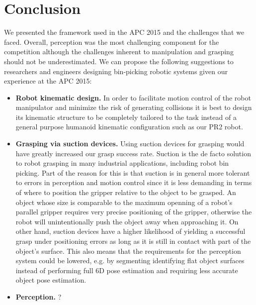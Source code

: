 \documentclass[letterpaper, 10pt, conference]{ieeeconf}
\begin{document}












\section{Conclusion}
\label{sec:conclusion}

We presented the framework used in the APC 2015 and the challenges that we faced.
Overall, perception was the most challenging component for the competition although
the challenges inherent to manipulation and grasping should not be underestimated. We can propose
the following suggestions to researchers and engineers designing bin-picking robotic
systems given our experience at the APC 2015:

\begin{itemize}
\item \textbf{Robot kinematic design.} In order to facilitate motion control of the robot manipulator   and minimize the risk of generating collisions it is best to design its kinematic
  structure to be completely tailored to the task instead of a general purpose humanoid kinematic configuration such as our PR2 robot. 
\item \textbf{Grasping via suction devices.} Using suction devices for grasping would have
  greatly increased our grasp success rate. Suction is the de facto solution
  to robot grasping in many industrial applications, including robot bin picking.
  Part of the reason for this is that suction
  is in general more tolerant to errors in perception and motion control since it is less demanding
  in terms of where to position the gripper relative to the object to be grasped. An object whose size is comparable to the maximum openning of a robot's parallel gripper requires very precise
  positioning of the gripper,  otherwise the robot will unintentionally push the object away when approaching it. On other hand, suction devices have a higher likelihood of yielding a successful grasp under positioning errors as long as it is still in contact with part of the
  object's surface. This also means that the requirements for the perception system could be
  lowered, e.g. by segmenting identifying flat object surfaces instead of performing full 6D pose estimation and requiring less accurate object pose estimation. 
 \item \textbf{Perception.} ?
\end{itemize}
\end{document}
